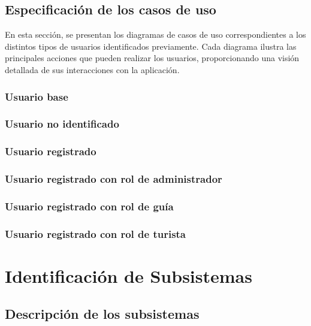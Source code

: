\subsection{Especificación de los casos de uso}
En esta sección, se presentan los diagramas de casos de uso correspondientes a los distintos tipos de usuarios identificados previamente. Cada diagrama ilustra las principales acciones que pueden realizar los usuarios, proporcionando una visión detallada de sus interacciones con la aplicación.
\subsubsection{Usuario base}

\subsubsection{Usuario no identificado}

\subsubsection{Usuario registrado}

\subsubsection{Usuario registrado con rol de administrador}

\subsubsection{Usuario registrado con rol de guía}

\subsubsection{Usuario registrado con rol de turista}

\section{Identificación de Subsistemas}
\subsection{Descripción de los subsistemas}
